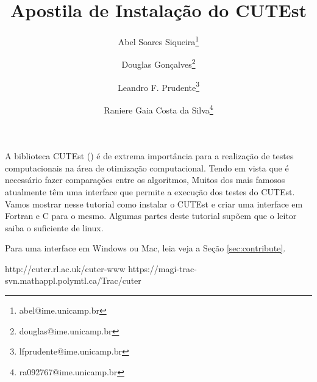 \documentclass[letterpaper,11pt]{article}
\title{Apostila de Instalação do CUTEst}
\author{
Abel Soares Siqueira\footnote{abel@ime.unicamp.br} \and
Douglas Gonçalves\footnote{douglas@ime.unicamp.br} \and
Leandro F. Prudente\footnote{lfprudente@ime.unicamp.br} \and
Raniere Gaia Costa da Silva\footnote{ra092767@ime.unicamp.br}}
\numberwithin{equation}{section}
\begin{document}
\maketitle
\tableofcontents
\vspace{1 cm}

A biblioteca CUTEst (\cite{bib:cuter1,bib:cuter2,bib:cutest}) é de extrema
importância para a realização de testes computacionais na área de otimização
computacional.  Tendo em vista que é necessário fazer comparações entre os
algoritmos, Muitos dos mais famosos atualmente têm uma interface que permite a
execução dos testes do CUTEst. Vamos mostrar nesse tutorial como instalar o
CUTEst e criar uma interface em Fortran e C para o mesmo. Algumas partes deste
tutorial supõem que o leitor saiba o suficiente de linux.

Para uma interface em Windows ou Mac, leia veja a Seção \ref{sec:contribute}.







\appendix


\begin{thebibliography}{3}
 http://cuter.rl.ac.uk/cuter-www 
 https://magi-trac-svn.mathappl.polymtl.ca/Trac/cuter 
\end{thebibliography}
\end{document}
